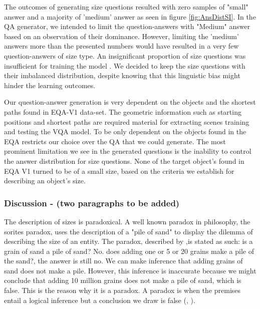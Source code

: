 The outcomes of generating size questions resulted with zero samples of "small" answer and a majority of 'medium' answer as seen in figure \ref{fig:AnsDistSI}. In the QA generator, we intended to limit the question-answers with "Medium" answer based on an observation of their dominance. However, limiting the 'medium' answers more than the presented numbers would have resulted in a very few question-answers of size type. An insignificant proportion of size questions was insufficient for training the model . We decided to keep the size questions with their imbalanced distribution, despite knowing that this linguistic bias might hinder the learning outcomes.  

Our question-answer generation is very dependent on the objects and the shortest paths found in EQA-V1 data-set. The geometric information such as  starting positions and shortest paths are required material for extracting scenes training and testing the VQA model. To be only dependent on the objects found in the EQA restricts our choice over the QA that we could generate. The most prominent limitation we see in the generated questions is the inability to control the answer distribution for size questions. None of the target object's found in EQA V1 turned to be of a small size, based on the criteria we establish for describing an object's size. 


\subsubsection{Discussion - (two paragraphs to be added)}

The description of sizes is paradoxical. A well known paradox in philosophy, the sorites paradox, uses the description of a "pile of sand" to display the dilemma of describing the size of an entity. The paradox, described by \cite{fisher2000sorites},is stated as such: is a grain of sand a pile of sand? No. does adding one or 5 or 20 grains make a pile of the sand?, the answer is still no. We can make inference that adding grains of sand does not make a pile. However, this inference is inaccurate because we might conclude that adding 10 million grains does not make a pile of sand, which is false. This is the reason why it is a paradox. A paradox is when the premises entail a logical inference but a conclusion we draw is false (\cite{fisher2000sorites}, \cite{sainsbury2009paradoxes}).


